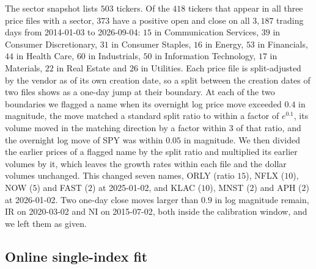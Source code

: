 The sector snapshot lists $503$ tickers. Of the $418$ tickers that appear in all three price files with a sector,
$373$ have a positive open and close on all $3{,}187$ trading days from 2014-01-03 to 2026-09-04: $15$ in
Communication Services, $39$ in Consumer Discretionary, $31$ in Consumer Staples, $16$ in Energy, $53$ in
Financials, $44$ in Health Care, $60$ in Industrials, $50$ in Information Technology, $17$ in Materials, $22$ in Real
Estate and $26$ in Utilities. Each price file is split-adjusted by the vendor as of its own creation date, so a
split between the creation dates of two files shows as a one-day jump at their boundary.
At each of the two boundaries we flagged a name when its overnight log price move exceeded $0.4$ in magnitude, the
move matched a standard split ratio to within a factor of $e^{0.1}$, its volume moved in the matching direction by
a factor within $3$ of that ratio, and the overnight log move of SPY was within $0.05$ in magnitude. We then divided
the earlier prices of a flagged name by the split ratio and multiplied its earlier volumes by it, which leaves the
growth rates within each file and the dollar volumes unchanged.
This changed seven names, ORLY (ratio $15$), NFLX ($10$), NOW ($5$) and FAST ($2$) at 2025-01-02, and KLAC ($10$),
MNST ($2$) and APH ($2$) at 2026-01-02. Two one-day close moves larger than $0.9$ in log magnitude remain, IR on
2020-03-02 and NI on 2015-07-02, both inside the calibration window, and we left them as given.

\subsection{Online single-index fit}

